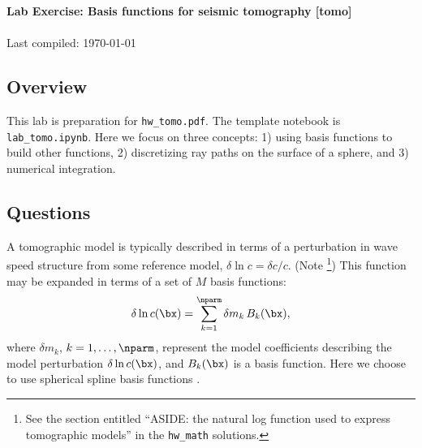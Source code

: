 \documentclass[11pt,titlepage,fleqn]{article}
\newcommand{\tfile}{{\tt lab\_tomo.ipynb}}
\begin{document}

\begin{spacing}{1.2}
\centering
{\large \bf Lab Exercise: Basis functions for seismic tomography [tomo]} \\
\cltag\ \\
Last compiled: \today
\end{spacing}


\subsection*{Overview}

This lab is preparation for {\tt hw\_tomo.pdf}. The template notebook is \tfile. Here we focus on three concepts: 1) using basis functions to build other functions, 2) discretizing ray paths on the surface of a sphere, and 3) numerical integration.

\subsection*{Questions}

A tomographic model is typically described in terms of a perturbation in wave speed structure from some reference model, \ie $\delta\ln c = \delta c/c$.
(Note \footnote{See the section entitled ``ASIDE: the natural log function used to express tomographic models'' in the {\tt hw\_math} solutions.})
This function may be expanded in terms of a set of $M$ basis functions:
%
\begin{equation}
\delta\ln c(\bx)=\sum_{k=1}^{\nparm} \delta m_k\,B_k(\bx),
\label{dlnv}
\end{equation}
%
where $\delta m_k$, $k=1,\ldots,\nparm$, represent the model coefficients describing the model perturbation $\delta\ln c(\bx)$, and $B_k(\bx)$ is a basis function. Here we choose to use spherical spline basis functions \citep{WangDahlen1995spline,Wang1998}.
\end{document}
